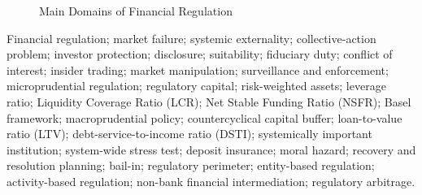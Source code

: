 \begin{figure}[H]

\caption{Main Domains of Financial Regulation}
\label{fig:ch23-regulation-structure}

\end{figure}


Financial regulation; market failure; systemic externality; collective-action problem;
investor protection; disclosure; suitability; fiduciary duty; conflict of interest;
insider trading; market manipulation; surveillance and enforcement;
microprudential regulation; regulatory capital; risk-weighted assets; leverage ratio;
Liquidity Coverage Ratio (LCR); Net Stable Funding Ratio (NSFR); Basel framework;
macroprudential policy; countercyclical capital buffer; loan-to-value ratio (LTV);
debt-service-to-income ratio (DSTI); systemically important institution;
system-wide stress test; deposit insurance; moral hazard;
recovery and resolution planning; bail-in; regulatory perimeter;
entity-based regulation; activity-based regulation; non-bank financial intermediation;
regulatory arbitrage.

